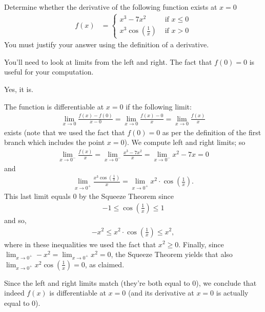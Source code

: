\begin{question}[2015Q]
Determine whether the derivative of the following function exists at
$x=0$
\begin{align*}
f(x) &=\begin{cases}
  x^3-7x^2 & \text{ if }  x\le 0\\
  x^3 \cos\left(\frac{1}{x}\right) & \text{ if } x> 0
\end{cases}
\end{align*}
You must justify your answer using the definition of a derivative.
\end{question}
\begin{hint} You'll need to look at limits from the left and right. The fact that $f(0)=0$ is useful for your computation.
\end{hint}
\begin{answer} Yes, it is.
\end{answer}
\begin{solution}
The function is differentiable at $x=0$ if the following limit:
\begin{align*}
\lim_{x\to 0}\frac{f(x)-f(0)}{x-0} = \lim_{x\to 0}\frac{f(x)-0}{x}=\lim_{x\to 0}
\frac{f(x)}{x}
\end{align*}
exists (note that we used the fact that $f(0)=0$ as per the definition of the first branch
which includes the point $x=0$). We compute left and right limits; so
\begin{align*}
\lim_{x\to 0^-}\frac{f(x)}{x}=\lim_{x\to 0^-}\frac{x^3-7x^2}{x}=\lim_{x\to 0^-}
x^2-7x=0
\end{align*}
and
\begin{align*}
\lim_{x\to 0^+}\frac{x^3\cos\left(\frac{1}{x}\right)}{x}=\lim_{x\to 0^+}x^2\cdot
\cos\left(\frac{1}{x}\right).
\end{align*}
This last limit equals $0$ by the Squeeze Theorem since
\begin{align*}
-1\le \cos\left(\frac{1}{x}\right)\le 1
\end{align*}
and so,
\begin{align*}
-x^2\le x^2\cdot \cos\left(\frac{1}{x}\right)\le x^2,
\end{align*}
where in these inequalities we used the fact that $x^2\ge 0$. Finally, since $\lim_{x\to 0^+}-x^2=\lim_{x\to 0^+}x^2=0$, the Squeeze Theorem
yields that also $\lim_{x\to 0^+}x^2\cos\left(\frac{1}{x}\right) =0$, as claimed.

Since the left and right limits match (they're both equal to $0$), we conclude that indeed
$f(x)$ is differentiable at $x=0$ (and its derivative at $x=0$ is actually equal to $0$).
\end{solution}


